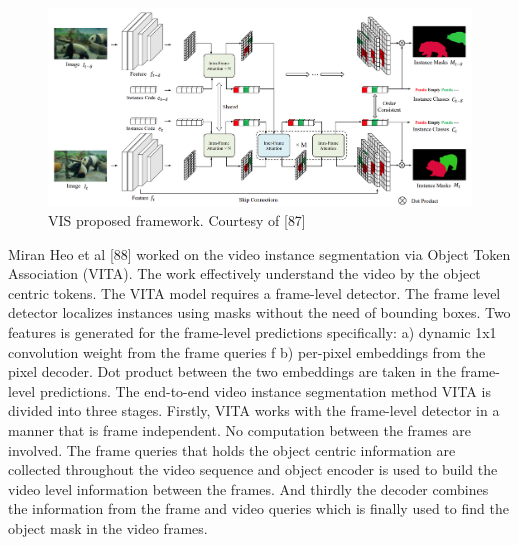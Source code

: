     \begin{figure}
		\centering
		\includegraphics[width=13cm]{images/VIS.png}
		\caption{VIS proposed framework. Courtesy of [87]}
		\label{fig:vis}
	\end{figure}
	Miran Heo et al [88] worked on the video instance segmentation via Object Token Association (VITA). The work effectively understand the video by the object centric tokens. The VITA model requires a frame-level detector. The frame level detector localizes instances using masks without the need of bounding boxes. Two features is generated for the frame-level predictions specifically: a) dynamic 1x1 convolution weight from the frame queries f b) per-pixel embeddings from the pixel decoder. Dot product between the two embeddings are taken in the frame-level predictions. The end-to-end video instance segmentation method VITA is divided into three stages. Firstly, VITA works with the frame-level detector in a manner that is frame independent. No computation between the frames are involved. The frame queries that holds the object centric information are collected throughout the video sequence and object encoder is used to build the video level information between the frames. And thirdly the decoder combines the information from the frame and video queries which is finally used to find the object mask in the video frames. 
	
